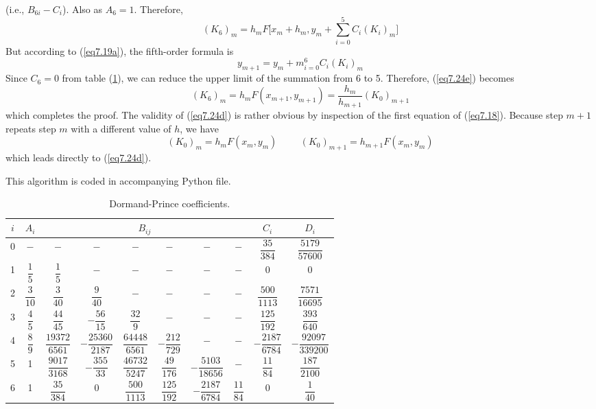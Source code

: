 \documentclass[12pt]{article}
\begin{document}
(i.e., $B_{6i} - C_{i}$). Also as $A_6 = 1$. Therefore,
\begin{equation}
\label{eq7.24e}
    (K_6)_m = h_m F \Bigg[ x_m + h_m, y_m + \sum_{i=0}^5 C_i (K_i)_m \Bigg]
\end{equation}
But according to (\ref{eq7.19a}), the fifth-order formula is
\begin{equation}
    y_{m+1} = y_m + m_{i=0}^6 C_i (K_i)_m
\end{equation}
Since $C_6 = 0$ from table (\ref{tab:coeff}), we can reduce the upper limit of the summation from 6
to 5. Therefore, (\ref{eq7.24e}) becomes
\begin{equation}
    (K_6)_m = h_m F(x_{m+1}, y_{m+1}) = \dfrac{h_m}{h_{m+1}} (K_0)_{m+1}
\end{equation}
which completes the proof.
The validity of (\ref{eq7.24d}) is rather obvious by inspection of the first equation of (\ref{eq7.18}). Because step $m+1$ repeats step $m$ with a different value of $h$, we have
\begin{equation}
    (K_0)_m = h_m F(x_m, y_m) \hspace{1cm} (K_0)_{m+1} = h_{m+1} F(x_m, y_m)
\end{equation}
which leads directly to (\ref{eq7.24d}).
\par
This algorithm is coded in accompanying Python file.
\begin{table}[]
\centering
\caption{Dormand-Prince coefficients.}
\vspace{1cm}
\label{tab:coeff}
\setlength\extrarowheight{20pt}

\begin{tabular}{@{}cccccccccc@{}}
\toprule
$i$ & $A_i$ & \multicolumn{6}{c}{$B_{ij}$} & $C_i$ & $D_i$ \\ \midrule
0 & $-$  &  $-$   &  $-$  &  $-$  & $-$   &  $-$ &  $-$ & $\dfrac{35}{384}$  & $\dfrac{5179}{57600}$   \\
1 & $\dfrac{1}{5}$   &  $\dfrac{1}{5}$   & $-$  & $-$   & $-$   & $-$ & $-$ &  0    & 0   \\
2 & $\dfrac{3}{10}$   &  $\dfrac{3}{40}$   &  $\dfrac{9}{40}$  &  $-$ &  $-$  &  $-$  & $-$ &  $\dfrac{500}{1113}$  &  $\dfrac{7571}{16695}$  \\
3 & $\dfrac{4}{5}$   &  $\dfrac{44}{45}$   &  $-\dfrac{56}{15}$  &  $\dfrac{32}{9}$  &  $-$  &  $-$ & $-$ & $\dfrac{125}{192}$  & $\dfrac{393}{640}$   \\
4 & $\dfrac{8}{9}$   &  $\dfrac{19372}{6561}$   & $-\dfrac{25360}{2187}$   & $\dfrac{64448}{6561}$    & $-\dfrac{212}{729}$   & $-$ & $-$ & $-\dfrac{2187}{6784}$   &  $-\dfrac{92097}{339200}$  \\
5 & 1   & $\dfrac{9017}{3168}$    & $-\dfrac{355}{33}$   & $\dfrac{46732}{5247}$    & $\dfrac{49}{176}$   & $-\dfrac{5103}{18656}$    & $-$ & $\dfrac{11}{84}$   & $\dfrac{187}{2100}$    \\
6 & 1   &  $\dfrac{35}{384}$   & 0    &  $\dfrac{500}{1113}$  &  $\dfrac{125}{192}$  &  $-\dfrac{2187}{6784}$  & $\dfrac{11}{84}$   &   0 & $\dfrac{1}{40}$\\ \bottomrule
\end{tabular}
\end{table}
\end{document}
